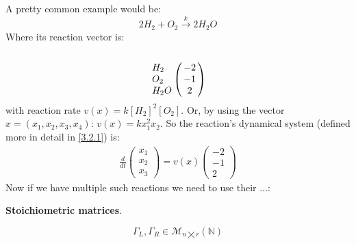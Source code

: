 A pretty common example would be:
\[
	2H_2 + O_2 \xrightarrow{k} 2H_2O
\]
Where its reaction vector is:
\[
	\bordermatrix{\cr \cr
		H_2 & -2 \cr
		O_2 & -1 \cr
		H_2O & 2 \cr
	}
\]
with reaction rate $v(x) = k[H_2]^2[O_2]$. Or, by using the vector $x=(x_1, x_2, x_3, x_4)$: $v(x) = k x_1^2 x_2$.
So the reaction's dynamical system (defined more in detail in \ref{3.2.1}) is:
\begin{align*}
	\frac{d}{dt}
	\begin{pmatrix*}
		x_1 \\
		x_2 \\
		x_3
	\end{pmatrix*} =
	v(x)
	\begin{pmatrix}
		-2 \\
		-1 \\
		2
	\end{pmatrix}
\end{align*}
Now if we have multiple such reactions we need to use their $\ldots$:
\begin{definition}
	\textbf{Stoichiometric matrices}.

	\[
		\Gamma_L, \Gamma_R \in \mathcal{M}_{n \bigtimes r}(\mathbb{N})
	\]
\end{definition}